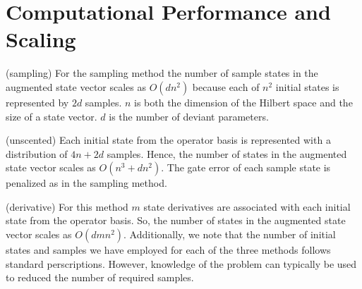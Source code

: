 \section{Computational Performance and Scaling \label{appendix:time}}

(sampling) For the sampling method the number of sample states in the augmented state vector
scales as $O(dn^{2})$
because each of $n^{2}$ initial
states is represented by $2d$ samples. $n$ is both the dimension of the Hilbert space
and the size of a state vector. $d$ is the number of deviant parameters.

(unscented) Each initial state from the operator basis
is represented with a distribution of $4n + 2d$ samples. Hence,
the number of states in the augmented state vector scales as $O(n^{3} + dn^{2})$.
The gate error of each sample state is penalized as in the sampling method.


(derivative) For this method $m$ state derivatives are associated with each
initial state from the operator basis.
So, the number of states in the augmented state vector scales as
$O(dmn^{2})$. Additionally, we note that the number of initial
states and samples we have employed for each of the three
methods follows standard perscriptions. However, knowledge
of the problem can typically be used to reduced the number
of required samples.
